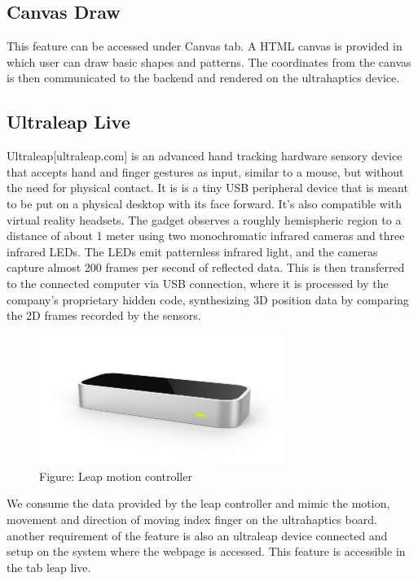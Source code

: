 \subsection*{Canvas Draw}
This feature can be accessed under Canvas tab. A HTML 
canvas is provided in which user can draw basic shapes and patterns. 
The coordinates from the canvas is then communicated to the backend and 
rendered on the ultrahaptics device. 

\subsection*{Ultraleap Live}

Ultraleap[ultraleap.com] is an advanced hand tracking  hardware sensory device that accepts hand and 
finger gestures as input, similar to a mouse, but without the need for physical contact.
It is is a tiny USB peripheral device that is meant to be put on a physical desktop 
with its face forward. It's also compatible with virtual reality headsets. 
The gadget observes a roughly hemispheric region to a distance of about 1 meter using 
two monochromatic infrared cameras and three infrared LEDs\cite{s130506380}. The LEDs emit patternless 
infrared light, and the cameras capture almost 200 frames per second of reflected data\cite{leap-controller}. 
This is then transferred to the connected computer via USB connection, where it is processed 
by the company's proprietary hidden code, synthesizing 3D position data by comparing the 
2D frames recorded by the sensors. \\

\begin{figure}[htb]
	\includegraphics[width=80mm]{gfx/motion-leap.png}
	\caption{Figure: Leap motion controller}
	\label{fig:features:csvinput}
\end{figure}
We consume the data provided by the leap controller and mimic the motion, movement and direction of 
moving index finger on the ultrahaptics board. another requirement of the feature 
is also an ultraleap device connected and 
setup on the system where the webpage is accessed. This feature is accessible in the tab leap 
live. \\

